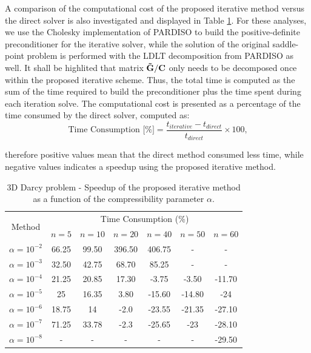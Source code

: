 \documentclass{wccm2024}
\begin{document}
A comparison of the computational cost of the proposed iterative method versus the direct solver is also investigated and displayed in Table \ref{tab:computational-cost}. For these analyses, we use the Cholesky implementation of PARDISO \cite{schenk2000efficient} to build the positive-definite preconditioner for the iterative solver, while the solution of the original saddle-point problem is performed with the LDLT decomposition from PARDISO as well. It shall be highlited that matrix $\mathbf{\Tilde{G}} / \mathbf{C}$ only needs to be decomposed once within the proposed iterative scheme. Thus, the total time is computed as the sum of the time required to build the preconditioner plus the time spent during each iteration solve. The computational cost is presented as a percentage of the time consumed by the direct solver, computed as:
\vskip -0.3cm
\begin{equation}
    \text{Time Consumption [\%]} = \frac{t_{iterative} - t_{direct}}{t_{direct}} \times 100 \text{,}
\end{equation}

\noindent therefore positive values mean that the direct method consumed less time, while negative values indicates a speedup using the proposed iterative method.

\begin{table}[!htb]
    \centering
    \caption{3D Darcy problem - Speedup of the proposed iterative method as a function of the compressibility parameter $\alpha$.}
    \begin{tabular}{ccccccc}
        \hline
        \multirow{2}{*}{Method} & \multicolumn{6}{c}{Time Consumption (\%)}                                \\ \cline{2-7} 
                                & $n=5$ & $n=10$ & $n=20$  & $n=40$   & $n=50$  & $n=60$      \\ \hline
        $\alpha=10^{-2}$        & 66.25   & 99.50    & 396.50 & 406.75 & -        & -           \\
        $\alpha=10^{-3}$        & 32.50   & 42.75    & 68.70  & 85.25 & -        & -           \\
        $\alpha=10^{-4}$        & 21.25    & 20.85    & 17.30  & -3.75 & -3.50 & -11.70 \\
        $\alpha=10^{-5}$        & 25   & 16.35    & 3.80  & -15.60 & -14.80 & -24  \\
        $\alpha=10^{-6}$        & 18.75    & 14    & -2.0  & -23.55 & -21.35 & -27.10 \\
        $\alpha=10^{-7}$        & 71.25   & 33.78    & -2.3  & -25.65 & -23 & -28.10 \\
        $\alpha=10^{-8}$        & -     & -      & -       & -        & -        & -29.50 \\
        \hline
    \end{tabular}
    \label{tab:computational-cost}
\end{table}
\end{document}
